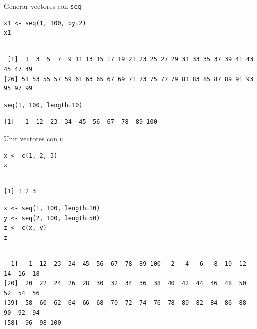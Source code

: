 \documentclass[aspectratio=169, usenames,svgnames,dvipsnames]{beamer}
\begin{document}
\begin{frame}[label={sec:orgb017e8c},fragile]{Generar vectores con \texttt{seq}}
 \lstset{language=r,label= ,caption= ,captionpos=b,numbers=none}
\begin{lstlisting}
x1 <- seq(1, 100, by=2)
x1
\end{lstlisting}

\begin{verbatim}

 [1]  1  3  5  7  9 11 13 15 17 19 21 23 25 27 29 31 33 35 37 39 41 43 45 47 49
[26] 51 53 55 57 59 61 63 65 67 69 71 73 75 77 79 81 83 85 87 89 91 93 95 97 99
\end{verbatim}


\lstset{language=r,label= ,caption= ,captionpos=b,numbers=none}
\begin{lstlisting}
seq(1, 100, length=10)
\end{lstlisting}

\begin{verbatim}
[1]   1  12  23  34  45  56  67  78  89 100
\end{verbatim}
\end{frame}


\begin{frame}[label={sec:org68b873a},fragile]{Unir vectores con \texttt{c}}
 \lstset{language=r,label= ,caption= ,captionpos=b,numbers=none}
\begin{lstlisting}
x <- c(1, 2, 3)
x
\end{lstlisting}

\begin{verbatim}

[1] 1 2 3
\end{verbatim}


\lstset{language=r,label= ,caption= ,captionpos=b,numbers=none}
\begin{lstlisting}
x <- seq(1, 100, length=10)
y <- seq(2, 100, length=50)
z <- c(x, y)
z
\end{lstlisting}

\begin{verbatim}

 [1]   1  12  23  34  45  56  67  78  89 100   2   4   6   8  10  12  14  16  18
[20]  20  22  24  26  28  30  32  34  36  38  40  42  44  46  48  50  52  54  56
[39]  58  60  62  64  66  68  70  72  74  76  78  80  82  84  86  88  90  92  94
[58]  96  98 100
\end{verbatim}
\end{frame}
\end{document}
